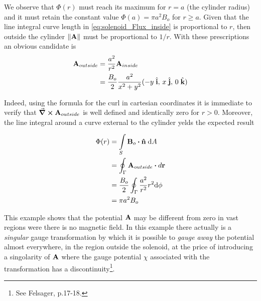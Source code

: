 We observe that $\Phi(r)$ must reach its maximum for $r = a$ (the cylinder radius) and it must retain the constant value $\Phi(a) = \pi a^2 B_o$ for $r \geq a$. Given that the line integral curve length in \ref{eq:solenoid_Flux_inside} is proportional to $r$, then outside the cylinder $\norm{\vb{A}}$ must be proportional to $1/r$. With these prescriptions an obvious candidate is 
\begin{equation}
\begin{aligned}
\vb{A}_{outside} &= \frac{a^2}{r^2} \vb{A}_{inside}  \\
				 &= \frac{B_o}{2} \frac{a^2}{x^2 + y^2} 
				  ( -y \;\hat{\vb{i}},\, x \;\hat{\vb{j}},\, 0  \; \hat{\vb{k}} ) 
\end{aligned}
\label{eq:solenoid_A_outside}
\end{equation}

Indeed, using the formula for the curl in cartesian coordinates it is immediate to verify that $\curl{\vb{A}_{outside}}$ is well defined and identically zero for $r > 0$. Moreover, the line integral around a curve external to the cylinder yelds the expected result

\begin{equation}
\begin{aligned}
\Phi(r) &= \int\limits_{S} \vb{B}_o \vdot \vu{n} \; \mathrm{d}A \\
&= \oint_{\Gamma} \vb{A}_{outside} \vdot d\vb{r} \\
&= \frac{B_o}{2} \oint_{\Gamma} \frac{a^2}{r^2} r^2 \mathrm{d}\phi \\
&= \pi a^2 B_{o} 
\end{aligned}
\label{eq:solenoid_Flux_outside} 
\end{equation}

This example shows that the potential $\vb{A}$ may be different from zero in vast regions were there is no magnetic field. In this example there actually is a \textit{singular} gauge transformation by which it is possible to \textit{gauge away} the potential almost everywhere, in the region outside the solenoid, at the price of introducing a singolarity of $\vb{A}$ where the gauge potential $\chi$ associated with the transformation has a discontinuity\footnote{See Felsager, p.17-18.}. 










  












 
